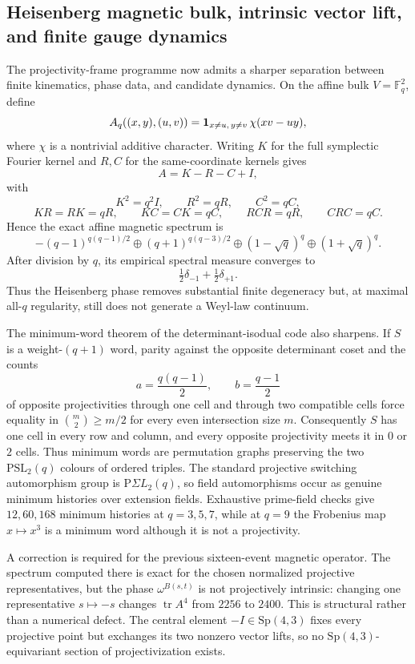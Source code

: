 \subsection{Heisenberg magnetic bulk, intrinsic vector lift, and finite gauge dynamics}

The projectivity-frame programme now admits a sharper separation between finite kinematics,
phase data, and candidate dynamics.  On the affine bulk $V=\mathbb F_q^2$, define
\[
 A_q((x,y),(u,v))={\bf 1}_{x\ne u,\,y\ne v}\,\chi(xv-uy),
\]
where $\chi$ is a nontrivial additive character.  Writing $K$ for the full symplectic
Fourier kernel and $R,C$ for the same-coordinate kernels gives
\[
 A=K-R-C+I,
\]
with
\[
 K^2=q^2I,\qquad R^2=qR,\qquad C^2=qC,
\]
\[
 KR=RK=qR,\qquad KC=CK=qC,\qquad RCR=qR,\qquad CRC=qC.
\]
Hence the exact affine magnetic spectrum is
\[
\boxed{
 -(q-1)^{q(q-1)/2}\oplus
 (q+1)^{q(q-3)/2}\oplus
 (1-\sqrt q)^q\oplus
 (1+\sqrt q)^q .}
\]
After division by $q$, its empirical spectral measure converges to
\[
\boxed{\tfrac12\delta_{-1}+\tfrac12\delta_{+1}.}
\]
Thus the Heisenberg phase removes substantial finite degeneracy but, at maximal all-$q$
regularity, still does not generate a Weyl-law continuum.

The minimum-word theorem of the determinant-isodual code also sharpens.  If $S$ is a
weight-$(q+1)$ word, parity against the opposite determinant coset and the counts
\[
 a=\frac{q(q-1)}2,
 \qquad
 b=\frac{q-1}{2}
\]
of opposite projectivities through one cell and through two compatible cells force equality
in ${m\choose2}\ge m/2$ for every even intersection size $m$.  Consequently $S$ has one
cell in every row and column, and every opposite projectivity meets it in $0$ or $2$ cells.
Thus minimum words are permutation graphs preserving the two $\mathrm{PSL}_2(q)$ colours
of ordered triples.  The standard projective switching automorphism group is
$\mathrm{P}\Sigma L_2(q)$, so field automorphisms occur as genuine minimum histories over
extension fields.  Exhaustive prime-field checks give $12,60,168$ minimum histories at
$q=3,5,7$, while at $q=9$ the Frobenius map $x\mapsto x^3$ is a minimum word although it
is not a projectivity.

A correction is required for the previous sixteen-event magnetic operator.  The spectrum
computed there is exact for the chosen normalized projective representatives, but the phase
$\omega^{B(s,t)}$ is not projectively intrinsic: changing one representative $s\mapsto-s$
changes $\operatorname{tr}A^4$ from $2256$ to $2400$.  This is structural rather than a
numerical defect.  The central element $-I\in\mathrm{Sp}(4,3)$ fixes every projective point
but exchanges its two nonzero vector lifts, so no $\mathrm{Sp}(4,3)$-equivariant section of
projectivization exists.

